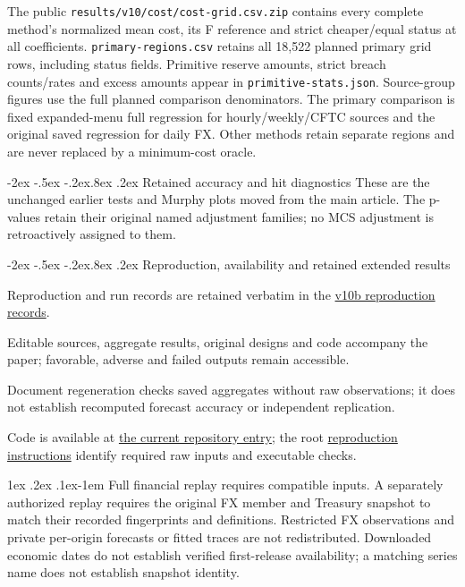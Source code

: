 \documentclass[10pt,a4paper]{article}
\makeatletter
\renewcommand\section{\@startsection{section}{1}{\z@}%
  {-2ex \@plus -.5ex \@minus -.2ex}{.8ex \@plus .2ex}%
  {\normalfont\large\bfseries}}
\renewcommand\paragraph{\@startsection{paragraph}{4}{\z@}%
  {1ex \@plus .2ex \@minus .1ex}{-1em}%
  {\normalfont\normalsize\bfseries}}
\makeatother
\begin{document}
The public \texttt{results/v10/cost/cost-grid.csv.zip} contains every complete method's normalized mean cost, its F reference and strict cheaper/equal status at all coefficients. \texttt{primary-regions.csv} retains all 18,522 planned primary grid rows, including status fields. Primitive reserve amounts, strict breach counts/rates and excess amounts appear in \texttt{primitive-stats.json}. Source-group figures use the full planned comparison denominators. The primary comparison is fixed expanded-menu full regression for hourly/weekly/CFTC sources and the original saved regression for daily FX. Other methods retain separate regions and are never replaced by a minimum-cost oracle.

\section{Retained accuracy and hit diagnostics}\label{sup:v10-diagnostics}
These are the unchanged earlier tests and Murphy plots moved from the main article. The p-values retain their original named adjustment families; no MCS adjustment is retroactively assigned to them.


\section{Reproduction, availability and retained extended results}\label{sup:reproduction}

Reproduction and run records are retained verbatim in the \href{https://github.com/ByronLi0207/financial-mathematics-paper-20261020/blob/revision-v10b/notes/v10b/supplement-audit-records.md}{v10b reproduction records}.

Editable sources, aggregate results, original designs and code accompany the
paper; favorable, adverse and failed outputs remain accessible.

Document regeneration checks saved aggregates without raw observations; it
does not establish recomputed forecast accuracy or independent replication.

Code is available at \href{https://github.com/ByronLi0207/financial-mathematics-paper-20261020/tree/revision-v13}{the current repository entry}; the root \href{https://github.com/ByronLi0207/financial-mathematics-paper-20261020/blob/revision-v13/REPRODUCING.md}{reproduction instructions} identify required raw inputs and executable checks.

\paragraph{Full financial replay requires compatible inputs.}
A separately authorized replay requires the original FX member and Treasury
snapshot to match their recorded fingerprints and definitions. Restricted FX
observations and private per-origin forecasts or fitted traces are not
redistributed. Downloaded economic dates do not establish verified first-release
availability; a matching series name does not establish snapshot identity.
\end{document}
